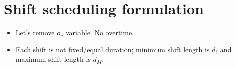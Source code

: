 \documentclass[11pt]{article}
\begin{document}







\section{Shift scheduling formulation}
\begin{itemize}
    \item Let's remove $o_u$ variable. No overtime.
    \item Each shift is not fixed/equal duration; minimum shift length is $d_\ell$ and maximum shift length is $d_M$. 
\end{itemize}
\end{document}
